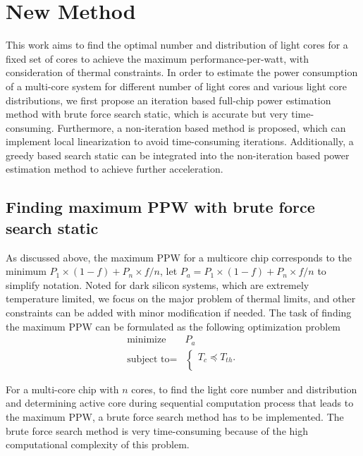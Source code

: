 \section{New Method}

This work aims to find the optimal number and distribution of light cores for a fixed set of cores to achieve the maximum performance-per-watt, with consideration of thermal constraints. In order to estimate the power consumption of a multi-core system for different number of light cores and various light core distributions, we first propose an iteration based full-chip power estimation method with brute force search static, which is accurate but very time-consuming. Furthermore, a non-iteration based method is proposed, which can implement local linearization to avoid time-consuming iterations. Additionally, a greedy based search static can be integrated into the non-iteration based power estimation method to achieve further acceleration.

\subsection{Finding maximum PPW with brute force search static}
As discussed above, the maximum PPW for a multicore chip corresponds to the minimum $P_{1} \times (1-f)+P_{n} \times f/n$, let $P_{a} = P_{1} \times (1-f)+P_{n} \times f/n$ to simplify notation. Noted for dark silicon systems, which are extremely temperature limited, we focus on the major problem of thermal limits, and other constraints can be added with minor modification if needed. The task of finding the maximum PPW can be formulated as the following optimization problem
\begin{equation}
\begin{split}
\text{minimize } & P_{a}\\
\text{subject to} = &\left\{
\begin{array}{c}
T_{c} \preceq T_{th}.\\
\end{array}
\right.
\end{split}
\end{equation}

For a multi-core chip with $n$ cores, to find the light core number and distribution and determining active core during sequential computation process that leads to the maximum PPW, a brute force search method has to be implemented. The brute force search method is very time-consuming because of the high computational complexity of this problem.

